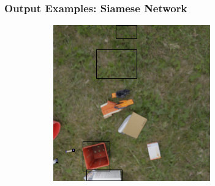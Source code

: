 \documentclass[13.5pt,aspecratio=169, xcolor=dvipsnames]{beamer}
\begin{document}
\begin{frame}
\begin{figure}
\begin{subfigure}{0.5\textwidth}
              \captionsetup{labelformat=empty}
            \end{subfigure}
            \captionsetup{labelformat=empty}
        \end{figure}

    \end{frame}


\begin{frame}
    \onehalfspacing
        \frametitle{Output Examples: Siamese Network}    
        \begin{figure}
            \begin{subfigure}{0.5\textwidth}
              \centering
              \includegraphics[width=\linewidth]{Example/Output/SM_3.png}
              \captionsetup{labelformat=empty}
            \end{subfigure}%
            \begin{subfigure}{0.5\textwidth}
              \centering

\end{subfigure}
\end{figure}
\end{frame}
\end{document}
